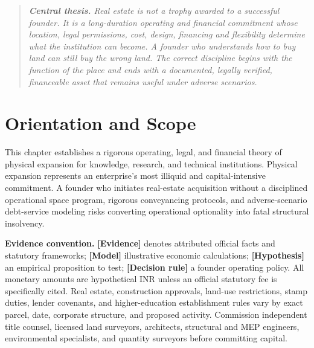 
\begin{quote}
\itshape
\textbf{Central thesis.} Real estate is not a trophy awarded to a successful founder. It is a long-duration operating and financial commitment whose location, legal permissions, cost, design, financing and flexibility determine what the institution can become. A founder who understands how to buy land can still buy the wrong land. The correct discipline begins with the function of the place and ends with a documented, legally verified, financeable asset that remains useful under adverse scenarios.
\end{quote}

\section*{Orientation and Scope}

This chapter establishes a rigorous operating, legal, and financial theory of physical expansion for knowledge, research, and technical institutions. Physical expansion represents an enterprise's most illiquid and capital-intensive commitment. A founder who initiates real-estate acquisition without a disciplined operational space program, rigorous conveyancing protocols, and adverse-scenario debt-service modeling risks converting operational optionality into fatal structural insolvency.

\textbf{Evidence convention.} \textbf{[Evidence]} denotes attributed official facts and statutory frameworks; \textbf{[Model]} illustrative economic calculations; \textbf{[Hypothesis]} an empirical proposition to test; \textbf{[Decision rule]} a founder operating policy. All monetary amounts are hypothetical INR unless an official statutory fee is specifically cited. Real estate, construction approvals, land-use restrictions, stamp duties, lender covenants, and higher-education establishment rules vary by exact parcel, date, corporate structure, and proposed activity. Commission independent title counsel, licensed land surveyors, architects, structural and MEP engineers, environmental specialists, and quantity surveyors before committing capital.

